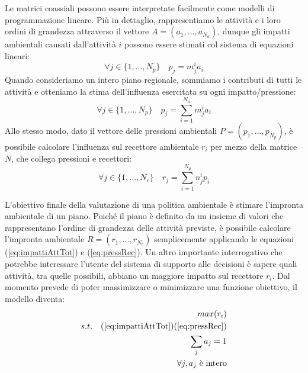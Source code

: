 Le matrici coassiali possono essere interpretate facilmente come modelli di programmazione lineare. Più in dettaglio, rappresentiamo le attività e i loro ordini di grandezza attraverso il vettore $A = (a_1,...,a_{N_a})$, dunque gli impatti ambientali causati dall'attività $i$ possono essere stimati col sistema di equazioni lineari:
\begin{equation}
\label{eq:impattiAtt}
	\forall j \in \{1,...,N_p\}  \quad p_j = m_j^i a_i
\end{equation}
Quando consideriamo un intero piano regionale, sommiamo i contributi di tutti le attività e otteniamo la stima dell'influenza esercitata su ogni impatto/pressione:
\begin{equation}
\label{eq:impattiAttTot}
	\forall j \in \{1,...,N_p\}  \quad  p_j = \sum_{i=1}^{N_a} m_j^i a_i
\end{equation}
Allo stesso modo, dato il vettore delle pressioni ambientali $P = (p_1,...,p_{N_p})$, è possibile calcolare l'influenza sul recettore ambientale $r_i$ per mezzo della matrice $N$, che collega pressioni e recettori:
\begin{equation}
\label{eq:pressRec}
	\forall j \in \{1,...,N_r\}  \quad  r_j = \sum_{i=1}^{N_p} n_j^i p_i
\end{equation}

L'obiettivo finale della valutazione di una politica ambientale è stimare l'impronta ambientale di un piano. Poiché il piano è definito da un insieme di valori che rappresentano l'ordine di grandezza delle attività previste, è possibile calcolare l'impronta ambientale $R = (r_1,...,r_{N_r})$ semplicemente applicando le equazioni (\ref{eq:impattiAttTot}) e (\ref{eq:pressRec}).
Un altro importante interrogativo che potrebbe interessare l'utente del sistema di supporto alle decisioni è sapere quali attività, tra quelle possibili, abbiano un maggiore impatto sul recettore $r_i$. Dal momento \clpr prevede di poter massimizzare o minimizzare una funzione obiettivo, il modello diventa:
\begin{equation}
\label{eq:impactOnGivenRec}
	\begin{aligned}
		max(r_i) \\
		s.t.  \quad (\ref{eq:impattiAttTot}) (\ref{eq:pressRec}) \\
		\sum_j a_j = 1 \\
		\forall j, a_j \mbox{ è intero} 
	\end{aligned}
\end{equation}

